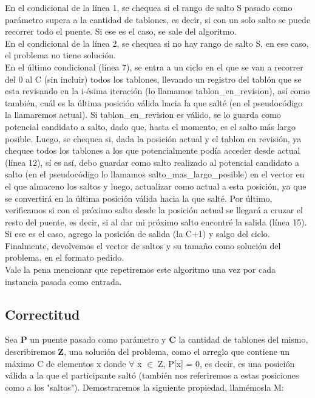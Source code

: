 \noindent En el condicional de la línea 1, se chequea si el rango de salto S pasado como parámetro supera a la cantidad de tablones, es decir, si con un solo salto se puede recorrer todo el puente. Si ese es el caso, se sale del algoritmo.\\
En el condicional de la línea 2, se chequea si no hay rango de salto S, en ese caso, el problema no tiene solución.\\
En el último condicional (línea 7), se entra a un ciclo en el que se van a recorrer del 0 al C (sin incluir) todos los tablones, llevando un registro del tablón que se esta revisando en la i-ésima iteración (lo llamamos tablon\_en\_revision), así como también, cuál es la última posición válida hacia la que salté (en el pseudocódigo la llamaremos actual). Si tablon\_en\_revision es válido, se lo guarda como potencial candidato a salto, dado que, hasta el momento, es el salto más largo posible. Luego, se chequea si, dada la posición actual y el tablon en revisión, ya chequee todos los tablones a los que potencialmente podía acceder desde actual (línea 12), sí es así, debo guardar como salto realizado al potencial candidato a salto (en el pseudocódigo lo llamamos salto\_mas\_largo\_posible) en el vector en el que almaceno los saltos y luego, actualizar como actual a esta posición, ya que se convertirá en la última posición válida hacia la que salté. Por último, verificamos si con el próximo salto desde la posición actual se llegará a cruzar el resto del puente, es decir, si al dar mi próximo salto encontré la salida (línea 15). Si ese es el caso, agrego la posición de salida (la C+1) y salgo del ciclo.\\
Finalmente, devolvemos el vector de saltos y su tamaño como solución del problema, en el formato pedido.\\
Vale la pena mencionar que repetiremos este algoritmo una vez por cada instancia pasada como entrada.\\



\subsection{Correctitud}

Sea \textbf{P} un puente pasado como par\'ametro y \textbf{C} la cantidad de tablones del mismo, describiremos \textbf{Z}, una soluci\'on del problema, como el arreglo que contiene un máximo C de elementos x donde $\forall$ x $\in$ Z, P[x] = 0, es decir, es una posici\'on v\'alida a la que el participante salt\'o (tambi\'en nos referiremos a estas posiciones como a los "saltos").
Demostraremos la siguiente propiedad, llam\'emosla M:\\

